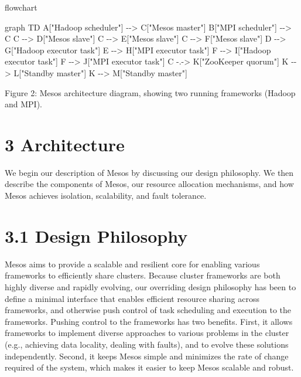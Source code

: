 \documentclass[
]{article}
\newenvironment{Shaded}{}{}
\newcommand{\NormalTok}[1]{#1}
\begin{document}
flowchart

\begin{Shaded}
\begin{Highlighting}[]
\NormalTok{graph TD}
\NormalTok{    A["Hadoop scheduler"] {-}{-}\textgreater{} C["Mesos master"]}
\NormalTok{    B["MPI scheduler"] {-}{-}\textgreater{} C}
\NormalTok{    C {-}{-}\textgreater{} D["Mesos slave"]}
\NormalTok{    C {-}{-}\textgreater{} E["Mesos slave"]}
\NormalTok{    C {-}{-}\textgreater{} F["Mesos slave"]}
\NormalTok{    D {-}{-}\textgreater{} G["Hadoop executor task"]}
\NormalTok{    E {-}{-}\textgreater{} H["MPI executor task"]}
\NormalTok{    F {-}{-}\textgreater{} I["Hadoop executor task"]}
\NormalTok{    F {-}{-}\textgreater{} J["MPI executor task"]}
\NormalTok{    C {-}.{-}\textgreater{} K["ZooKeeper quorum"]}
\NormalTok{    K {-}{-}\textgreater{} L["Standby master"]}
\NormalTok{    K {-}{-}\textgreater{} M["Standby master"]}
\end{Highlighting}
\end{Shaded}

Figure 2: Mesos architecture diagram, showing two running frameworks
(Hadoop and MPI).

\section{3 Architecture}\label{architecture}

We begin our description of Mesos by discussing our design philosophy.
We then describe the components of Mesos, our resource allocation
mechanisms, and how Mesos achieves isolation, scalability, and fault
tolerance.

\section{3.1 Design Philosophy}\label{design-philosophy}

Mesos aims to provide a scalable and resilient core for enabling various
frameworks to efficiently share clusters. Because cluster frameworks are
both highly diverse and rapidly evolving, our overriding design
philosophy has been to define a minimal interface that enables efficient
resource sharing across frameworks, and otherwise push control of task
scheduling and execution to the frameworks. Pushing control to the
frameworks has two benefits. First, it allows frameworks to implement
diverse approaches to various problems in the cluster (e.g., achieving
data locality, dealing with faults), and to evolve these solutions
independently. Second, it keeps Mesos simple and minimizes the rate of
change required of the system, which makes it easier to keep Mesos
scalable and robust.
\end{document}
